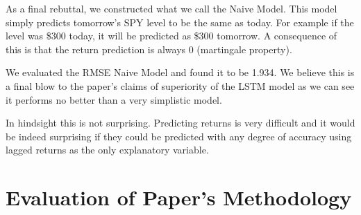 \documentclass{article}
\begin{document}
As a final rebuttal, we constructed what we call the Naive Model. This model simply predicts tomorrow's SPY level to be the same as today. For example if the level was \$300 today, it will be predicted as \$300 tomorrow. A consequence of this is that the return prediction is always 0 (martingale property).

We evaluated the RMSE Naive Model and found it to be 1.934. We believe this is a final blow to the paper's claims of superiority of the LSTM model as we can see it performs no better than a very simplistic model. 

In hindsight this is not surprising. Predicting returns is very difficult and it would be indeed surprising if they could be predicted with any degree of accuracy using lagged returns as the only explanatory variable. 

\section{Evaluation of Paper's Methodology}

\end{document}
